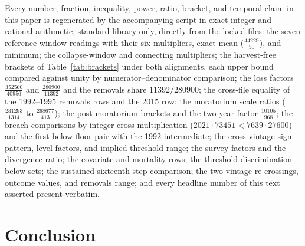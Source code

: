 \documentclass[10pt,twocolumn]{article}
\theoremstyle{plain}
\theoremstyle{remark}
\begin{document}
Every number, fraction, inequality, power, ratio, bracket, and
temporal claim in this paper is regenerated by the accompanying script
in exact integer and rational arithmetic, standard library only,
directly from the locked files: the seven reference-window readings
with their six multipliers, exact mean
(\(\tfrac{44229}{50}\)), and minimum; the collapse-window and
connecting multipliers; the harvest-free brackets of
Table~\ref{tab:brackets} under both alignments, each upper bound
compared against unity by numerator--denominator comparison; the loss
factors \(\tfrac{352560}{40956}\) and \(\tfrac{280900}{11392}\) and
the removals share \(11392/280900\); the cross-file equality of the
1992--1995 removals rows and the 2015 row; the moratorium scale ratios
(\(\tfrac{231293}{1314}\) to \(\tfrac{268677}{413}\)); the
post-moratorium brackets and the two-year factor
\(\tfrac{10105}{968}\); the breach comparisons by integer
cross-multiplication (\(2021 \cdot 73451 < 7639 \cdot 27600\)) and the
first-below-floor pair with the 1992 intermediate; the cross-vintage
sign pattern, level factors, and implied-threshold range; the survey
factors and the divergence ratio; the covariate and mortality rows;
the threshold-discrimination below-sets; the sustained sixteenth-step
comparison; the two-vintage re-crossings, outcome values, and removals
range; and every headline number of this text asserted present
verbatim.

\section{Conclusion}\label{conclusion}
\end{document}
